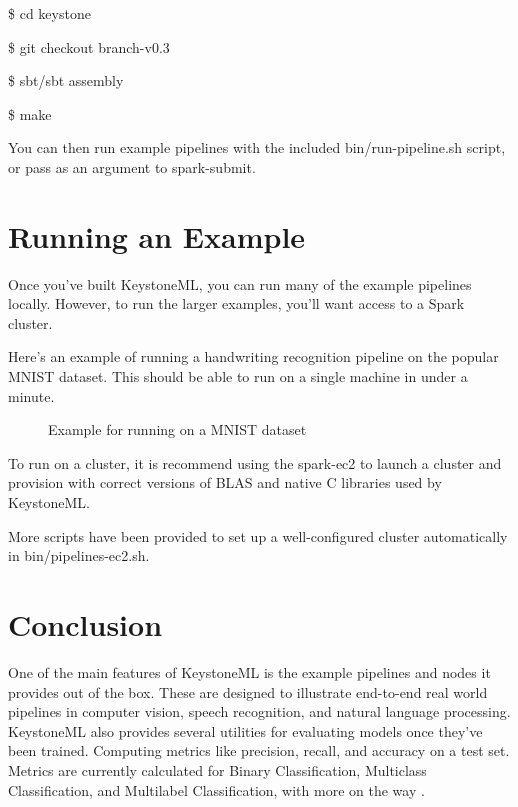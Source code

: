 \documentclass[9pt,twocolumn,twoside]{../../styles/osajnl}
\begin{document}
\$ cd keystone

\$ git checkout branch-v0.3

\$ sbt/sbt assembly

\$ make

You can then run example pipelines with the included
bin/run-pipeline.sh script, or pass as an argument to spark-submit.

\section{Running an Example}

Once you’ve built KeystoneML, you can run many of the example
pipelines locally. However, to run the larger examples, you’ll want
access to a Spark cluster.

Here’s an example of running a handwriting recognition pipeline on the
popular MNIST dataset. This should be able to run on a single
machine in under a minute.

\begin{figure}[htbp]
\centering
{}
\caption{Example for running on a MNIST dataset}
\label{fig:Example for running on a MNIST dataset}
\end{figure}

To run on a cluster, it is recommend using the spark-ec2 to launch a
cluster and provision with correct versions of BLAS and native C
libraries used by KeystoneML.

More scripts have been provided to set up a well-configured cluster
automatically in bin/pipelines-ec2.sh.


\section{Conclusion}

One of the main features of KeystoneML is the example pipelines and
nodes it provides out of the box. These are designed to illustrate
end-to-end real world pipelines in computer vision, speech
recognition, and natural language processing. KeystoneML also provides
several utilities for evaluating models once they’ve been
trained. Computing metrics like precision, recall, and accuracy on a
test set. Metrics are currently calculated for Binary Classification,
Multiclass Classification, and Multilabel Classification, with more on
the way \cite{www-keystoneml} .




\end{document}
